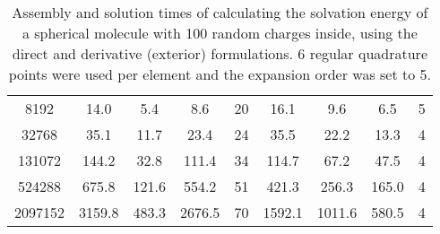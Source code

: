 \begin{table*}[]
\begin{tabular}{c|cccc|cccc}
    8192                                                         & 14.0                                                     & 5.4                                                         & 8.6                                                      & 20            & 16.1                                                     & 9.6                                                         & 6.5                                                      & 5            \\
    32768                                                        & 35.1                                                     & 11.7                                                        & 23.4                                                     & 24            & 35.5                                                     & 22.2                                                        & 13.3                                                     & 4            \\
    131072                                                       & 144.2                                                    & 32.8                                                        & 111.4                                                    & 34            & 114.7                                                    & 67.2                                                        & 47.5                                                     & 4            \\
    524288                                                       & 675.8                                                    & 121.6                                                       & 554.2                                                    & 51            & 421.3                                                    & 256.3                                                       & 165.0                                                    & 4            \\
    2097152                                                      & 3159.8                                                   & 483.3                                                       & 2676.5                                                   & 70            & 1592.1                                                   & 1011.6                                                      & 580.5                                                    & 4           
    \end{tabular}
    \caption{Assembly and solution times of calculating the solvation energy of a spherical molecule with 100 random charges inside, using the direct and derivative (exterior) formulations.
    6 regular quadrature points were used per element and the \fmm expansion order was set to 5.}
    \label{tab:sphere_time}
\end{table*}

